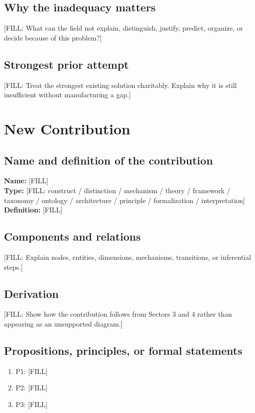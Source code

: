 \documentclass[11pt]{article}
\begin{document}
\subsection{Why the inadequacy matters}
[FILL: What can the field not explain, distinguish, justify, predict, organize,
or decide because of this problem?]

\subsection{Strongest prior attempt}
[FILL: Treat the strongest existing solution charitably. Explain why it is
still insufficient without manufacturing a gap.]


\section{New Contribution}
\label{sec:s5}


\subsection{Name and definition of the contribution}
\noindent\textbf{Name:} [FILL]\\
\textbf{Type:} [FILL: construct / distinction / mechanism / theory / framework /
taxonomy / ontology / architecture / principle / formalization / interpretation]\\
\textbf{Definition:} [FILL]

\subsection{Components and relations}
[FILL: Explain nodes, entities, dimensions, mechanisms, transitions, or
inferential steps.]

\subsection{Derivation}
[FILL: Show how the contribution follows from Sectors 3 and 4 rather than
appearing as an unsupported diagram.]

\subsection{Propositions, principles, or formal statements}
\begin{enumerate}
  \item P1: [FILL]
  \item P2: [FILL]
  \item P3: [FILL]
\end{enumerate}
\end{document}
